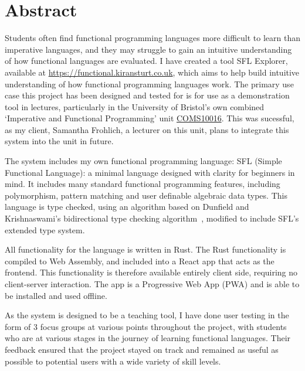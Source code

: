 \chapter*{Abstract}
Students often find functional programming languages more difficult to learn than imperative languages, and they may struggle to gain an intuitive understanding of how functional languages are evaluated. I have created a tool SFL Explorer, available at \href{https://functional.kiransturt.co.uk}{https://functional.kiransturt.co.uk}, which aims to help build intuitive understanding of how functional programming languages work. The primary use case this project has been designed and tested for is for use as a demonstration tool in lectures, particularly in the University of Bristol's own combined `Imperative and Functional Programming' unit \hyperref[COMS10016]{COMS10016}. This was sucessful, as my client, Samantha Frohlich, a lecturer on this unit, plans to integrate this system into the unit in future. 

The system includes my own functional programming language: SFL (Simple Functional Language): a minimal language designed with clarity for beginners in mind. It includes many standard functional programming features, including polymorphism, pattern matching and user definable algebraic data types. This language is type checked, using an algorithm based on Dunfield and Krishnaswami's bidirectional type checking algorithm~\cite{completebidir}, modified to include SFL's extended type system. 

All functionality for the language is written in Rust. The Rust functionality is compiled to Web Assembly, and included into a React app that acts as the frontend. This functionality is therefore available entirely client side, requiring no client-server interaction. The app is a Progressive Web App (PWA) and is able to be installed and used offline. 

As the system is designed to be a teaching tool, I have done user testing in the form of 3 focus groups at various points throughout the project, with students who are at various stages in the journey of learning functional languages. Their feedback ensured that the project stayed on track and remained as useful as possible to potential users with a wide variety of skill levels. 



